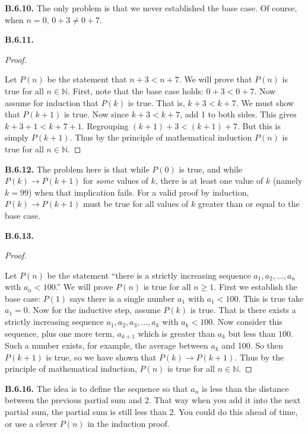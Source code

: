 \documentclass[10pt,]{book}
\theoremstyle{plain}
\theoremstyle{definition}
\theoremstyle{definition}
\theoremstyle{definition}
\theoremstyle{definition}
\numberwithin{equation}{chapter}
\def\N{\mathbb N}
\def\imp{\rightarrow}
\newcommand{\lt}{<}
\begin{document}
\par\smallskip
\noindent\textbf{B.6.10.} \hypertarget{p-2193}{}%
The only problem is that we never established the base case. Of course, when \(n = 0\), \(0+3 \ne 0+7\).%
\par\smallskip
\noindent\textbf{B.6.11.} \begin{proof}\hypertarget{proof-50}{}
\hypertarget{p-2195}{}%
Let \(P(n)\) be the statement that \(n + 3 \lt  n + 7\). We will prove that \(P(n)\) is true for all \(n \in \N\). First, note that the base case holds: \(0+3 \lt  0+7\). Now assume for induction that \(P(k)\) is true. That is, \(k+3 \lt  k+7\). We must show that \(P(k+1)\) is true. Now since \(k + 3 \lt  k + 7\), add 1 to both sides. This gives \(k + 3 + 1 \lt  k + 7 + 1\). Regrouping \((k+1) + 3 \lt  (k+1) + 7\). But this is simply \(P(k+1)\). Thus by the principle of mathematical induction \(P(n)\) is true for all \(n \in \N\).%
\end{proof}
\par\smallskip
\noindent\textbf{B.6.12.} \hypertarget{p-2198}{}%
The problem here is that while \(P(0)\) is true, and while \(P(k) \imp P(k+1)\) for \emph{some} values of \(k\), there is at least one value of \(k\) (namely \(k = 99\)) when that implication fails. For a valid proof by induction, \(P(k) \imp P(k+1)\) must be true for all values of \(k\) greater than or equal to the base case.%
\par\smallskip
\noindent\textbf{B.6.13.} \begin{proof}\hypertarget{proof-52}{}
\hypertarget{p-2200}{}%
Let \(P(n)\) be the statement ``there is a strictly increasing sequence \(a_1, a_2, \ldots, a_n\) with \(a_n \lt  100\).'' We will prove \(P(n)\) is true for all \(n \ge 1\). First we establish the base case: \(P(1)\) says there is a single number \(a_1\) with \(a_1 \lt  100\). This is true \textendash{} take \(a_1 = 0\). Now for the inductive step, assume \(P(k)\) is true. That is there exists a strictly increasing sequence \(a_1, a_2, a_3, \ldots, a_k\) with \(a_k \lt  100\). Now consider this sequence, plus one more term, \(a_{k+1}\) which is greater than \(a_k\) but less than \(100\). Such a number exists, for example, the average between \(a_k\) and 100. So then \(P(k+1)\) is true, so we have shown that \(P(k) \imp P(k+1)\). Thus by the principle of mathematical induction, \(P(n)\) is true for all \(n \in \N\).%
\end{proof}
\par\smallskip
\noindent\textbf{B.6.16.} \hypertarget{p-2205}{}%
The idea is to define the sequence so that \(a_n\) is less than the distance between the previous partial sum and 2. That way when you add it into the next partial sum, the partial sum is still less than 2. You could do this ahead of time, or use a clever \(P(n)\) in the induction proof.%
\end{document}
